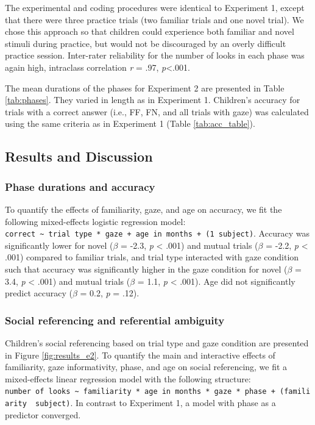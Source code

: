 \documentclass[a4paper,man,apacite,floatsintext]{apa6}
\begin{document}
The experimental and coding procedures were identical to Experiment 1,
except that there were three practice trials (two familiar trials and
one novel trial). We chose this approach so that children could
experience both familiar and novel stimuli during practice, but would
not be discouraged by an overly difficult practice session. Inter-rater
reliability for the number of looks in each phase was again high,
intraclass correlation \emph{r} = .97, \emph{p}\textless{}.001.

The mean durations of the phases for Experiment 2 are presented in Table
\ref{tab:phases}. They varied in length as in Experiment 1. Children's
accuracy for trials with a correct answer (i.e., FF, FN, and all trials
with gaze) was calculated using the same criteria as in Experiment 1
(Table \ref {tab:acc_table}).

\subsection{Results and Discussion}\label{results-and-discussion-1}

\subsubsection{Phase durations and
accuracy}\label{phase-durations-and-accuracy}

To quantify the effects of familiarity, gaze, and age on accuracy, we
fit the following mixed-effects logistic regression model:
\texttt{correct\ \textasciitilde{}\ trial\ type\ *\ gaze\ +\ age\ in\ months\ +\ (1\textbar{}\ subject)}.
Accuracy was significantly lower for novel (\(\beta\) = -2.3, \emph{p}
\textless{} .001) and mutual trials (\(\beta\) = -2.2, \emph{p}
\textless{} .001) compared to familiar trials, and trial type interacted
with gaze condition such that accuracy was significantly higher in the
gaze condition for novel (\(\beta\) = 3.4, \emph{p} \textless{} .001)
and mutual trials (\(\beta\) = 1.1, \emph{p} \textless{} .001). Age did
not significantly predict accuracy (\(\beta\) = 0.2, \emph{p} = .12).

\subsubsection{Social referencing and referential
ambiguity}\label{social-referencing-and-referential-ambiguity}

Children's social referencing based on trial type and gaze condition are
presented in Figure \ref{fig:results_e2}. To quantify the main and
interactive effects of familiarity, gaze informativity, phase, and age
on social referencing, we fit a mixed-effects linear regression model
with the following structure:
\texttt{number\ of\ looks\ \textasciitilde{}\ familiarity\ *\ age\ in\ months\ *\ gaze\ *\ phase\ +\ (familiarity\ \textbar{}\ subject)}.
In contrast to Experiment 1, a model with phase as a predictor
converged.
\end{document}
